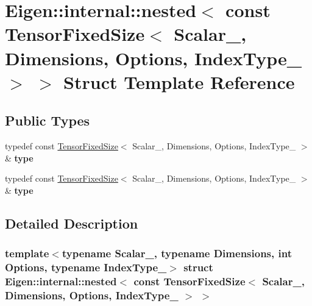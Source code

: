 \hypertarget{struct_eigen_1_1internal_1_1nested_3_01const_01_tensor_fixed_size_3_01_scalar___00_01_dimensions98981d6c192c4870f523d84eb9e7798b}{}\section{Eigen\+:\+:internal\+:\+:nested$<$ const Tensor\+Fixed\+Size$<$ Scalar\+\_\+, Dimensions, Options, Index\+Type\+\_\+ $>$ $>$ Struct Template Reference}
\label{struct_eigen_1_1internal_1_1nested_3_01const_01_tensor_fixed_size_3_01_scalar___00_01_dimensions98981d6c192c4870f523d84eb9e7798b}
\subsection*{Public Types}
\begin{DoxyCompactItemize}
\item 
\mbox{\label{struct_eigen_1_1internal_1_1nested_3_01const_01_tensor_fixed_size_3_01_scalar___00_01_dimensions98981d6c192c4870f523d84eb9e7798b_a9dba84e7a90bb8041362cbc6ec687866}} 
typedef const \hyperlink{class_eigen_1_1_tensor_fixed_size}{Tensor\+Fixed\+Size}$<$ Scalar\+\_\+, Dimensions, Options, Index\+Type\+\_\+ $>$ \& {\bfseries type}
\item 
\mbox{\label{struct_eigen_1_1internal_1_1nested_3_01const_01_tensor_fixed_size_3_01_scalar___00_01_dimensions98981d6c192c4870f523d84eb9e7798b_a9dba84e7a90bb8041362cbc6ec687866}} 
typedef const \hyperlink{class_eigen_1_1_tensor_fixed_size}{Tensor\+Fixed\+Size}$<$ Scalar\+\_\+, Dimensions, Options, Index\+Type\+\_\+ $>$ \& {\bfseries type}
\end{DoxyCompactItemize}


\subsection{Detailed Description}
\subsubsection*{template$<$typename Scalar\+\_\+, typename Dimensions, int Options, typename Index\+Type\+\_\+$>$\newline
struct Eigen\+::internal\+::nested$<$ const Tensor\+Fixed\+Size$<$ Scalar\+\_\+, Dimensions, Options, Index\+Type\+\_\+ $>$ $>$}



